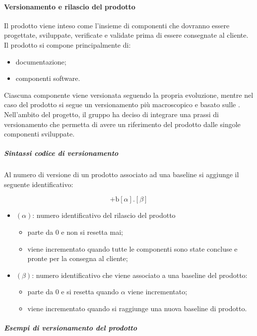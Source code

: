 	\paragraph{Versionamento e rilascio del prodotto}

	Il prodotto viene inteso come l'insieme di componenti che dovranno essere progettate, sviluppate, verificate e validate prima di essere consegnate al cliente. Il prodotto si compone principalmente di:
	\begin{itemize}
		\item documentazione;
		\item componenti software.
	\end{itemize}

	Ciascuna componente viene versionata seguendo la propria evoluzione, mentre nel caso del prodotto si segue un versionamento più macroscopico e basato sulle .
	Nell'ambito del progetto, il gruppo ha deciso di integrare una prassi di versionamento che permetta di avere un riferimento del prodotto dalle singole componenti sviluppate.

		\subparagraph{Sintassi codice di versionamento}

		Al numero di versione di un prodotto associato ad una baseline si aggiunge il seguente identificativo:

		\[%
			\text{+b}[\alpha].[\beta]
		\]

		\begin{itemize}
			\item \((\alpha)\): numero identificativo del rilascio del prodotto
			\begin{itemize}
				\item parte da 0 e non si resetta mai;
				\item viene incrementato quando tutte le componenti sono state concluse e pronte per la consegna al cliente;
			\end{itemize}
			\item \((\beta)\): numero identificativo che viene associato a una baseline del prodotto:
			\begin{itemize}
	  			\item parte da 0 e si resetta quando \(\alpha\) viene incrementato;
				\item viene incrementato quando si raggiunge una nuova baseline di prodotto. 
			\end{itemize}
		\end{itemize}

		\subparagraph{Esempi di versionamento del prodotto}

